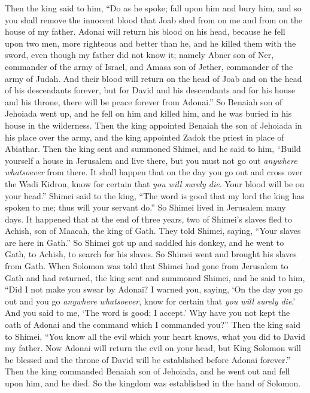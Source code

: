 \begin{biblechapter}
\verse Then the king said to him, “Do as he spoke; fall upon him and bury him, and so you shall remove the innocent blood that Joab shed from on me and from on the house of my father.
\verse Adonai will return his blood on his head, because he fell upon two men, more righteous and better than he, and he killed them with the sword, even though my father did not know it; namely Abner son of Ner, commander of the army of Israel, and Amasa son of Jether, commander of the army of Judah.
\verse And their blood will return on the head of Joab and on the head of his descendants forever, but for David and his descendants and for his house and his throne, there will be peace forever from Adonai.”
\verse So Benaiah son of Jehoiada went up, and he fell on him and killed him, and he was buried in his house in the wilderness.
\verse Then the king appointed Benaiah the son of Jehoiada in his place over the army, and the king appointed Zadok the priest in place of Abiathar.
\verse Then the king sent and summoned Shimei, and he said to him, “Build yourself a house in Jerusalem and live there, but you must not go out \textit{anywhere whatsoever} from there.
\verse It shall happen that on the day you go out and cross over the Wadi Kidron, know for certain that \textit{you will surely die}. Your blood will be on your head.”
\verse Shimei said to the king, “The word is good that my lord the king has spoken to me; thus will your servant do.” So Shimei lived in Jerusalem many days.
\verse It happened that at the end of three years, two of Shimei’s slaves fled to Achish, son of Maacah, the king of Gath. They told Shimei, saying, “Your slaves are here in Gath.”
\verse So Shimei got up and saddled his donkey, and he went to Gath, to Achish, to search for his slaves. So Shimei went and brought his slaves from Gath.
\verse When Solomon was told that Shimei had gone from Jerusalem to Gath and had returned,
\verse the king sent and summoned Shimei, and he said to him, “Did I not make you swear by Adonai? I warned you, saying, ‘On the day you go out and you go \textit{anywhere whatsoever}, know for certain that \textit{you will surely die}.’ And you said to me, ‘The word is good; I accept.’
\verse Why have you not kept the oath of Adonai and the command which I commanded you?”
\verse Then the king said to Shimei, “You know all the evil which your heart knows, what you did to David my father. Now Adonai will return the evil on your head,
\verse but King Solomon will be blessed and the throne of David will be established before Adonai forever.”
\verse Then the king commanded Benaiah son of Jehoiada, and he went out and fell upon him, and he died. So the kingdom was established in the hand of Solomon.
\end{biblechapter}

